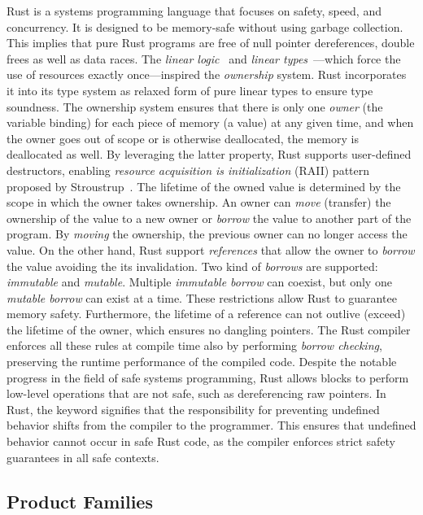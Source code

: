 Rust is a systems programming language that focuses on safety, speed, and concurrency. It is designed to be memory-safe without using garbage collection. 
This implies that pure Rust programs are free of null pointer dereferences, double frees as well as data races.
The \emph{linear logic}~\cite{Girard87, Girard95} and \emph{linear types}~\cite{Wadler90, Odersky92}---which force the use of resources exactly once---inspired the \emph{ownership} system.
Rust incorporates it into its type system as relaxed form of pure linear types to ensure type soundness.
The ownership system ensures that there is only one \emph{owner} (the variable binding) for each piece of memory (a value) at any given time, and when the owner goes out of scope or is otherwise deallocated, the memory is deallocated as well. By leveraging the latter property, Rust supports user-defined destructors, enabling \emph{resource acquisition is initialization} (RAII) pattern proposed by Stroustrup~\cite{Stroustrup94}.
The lifetime of the owned value is determined by the scope in which the owner takes ownership.
An owner can \emph{move} (transfer) the ownership of the value to a new owner or \emph{borrow} the value to another part of the program.
By \emph{moving} the ownership, the previous owner can no longer access the value.
On the other hand, Rust support \emph{references} that allow the owner to \emph{borrow} the value avoiding the its invalidation.
Two kind of \emph{borrows} are supported: \emph{immutable} and \emph{mutable}.
Multiple \emph{immutable borrow} can coexist, but only one \emph{mutable borrow} can exist at a time. 
These restrictions allow Rust to guarantee memory safety. Furthermore, the lifetime of a reference can not outlive (exceed) the lifetime of the owner, which ensures no dangling pointers.
The Rust compiler enforces all these rules at compile time also by performing \emph{borrow checking}, preserving the runtime performance of the compiled code.
Despite the notable progress in the field of safe systems programming, Rust allows  blocks to perform low-level operations that are not safe, such as dereferencing raw pointers.
In Rust, the  keyword signifies that the responsibility for preventing undefined behavior shifts from the compiler to the programmer. This ensures that undefined behavior cannot occur in safe Rust code, as the compiler enforces strict safety guarantees in all safe contexts.

\subsection{Product Families}\label{subsec:bg:spl}


